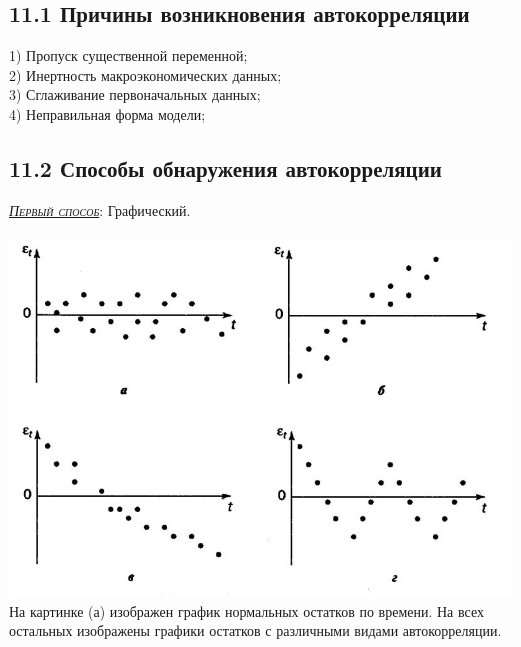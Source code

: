 \documentclass[a0,final]{a0poster}
\begin{document}
\begin{multicols}{4}
\subsection*{\textbf{11.1 Причины возникновения автокорреляции}}
1) Пропуск существенной переменной; \\
2) Инертность макроэкономических данных; \\
3) Сглаживание первоначальных данных; \\
4) Неправильная форма модели;

\subsection*{\textbf{11.2 Способы обнаружения автокорреляции}}
\underline{\textsc{\textit{Первый способ}}}: Графический. \\
\\
\includegraphics[width=0.24\paperwidth]{ostatki_t.jpg}
На картинке (а) изображен график нормальных остатков по времени. На всех остальных изображены графики остатков с различными видами автокорреляции. \\


\end{multicols}
\end{document}
